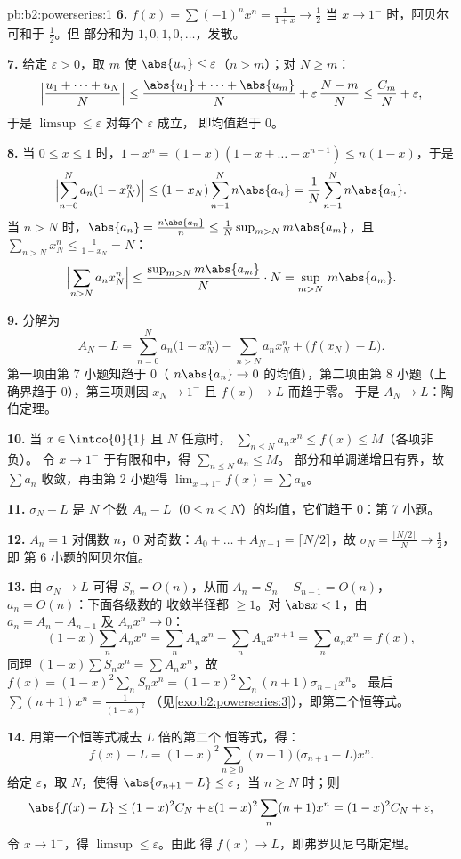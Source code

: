 \begin{solution}{pb:b2:powerseries:1}
\textbf{6.} $f(x) = \sum(-1)^nx^n = \frac{1}{1+x} \to \frac12$
当 $x \to 1^-$ 时，阿贝尔可和于 $\frac12$。但
部分和为 $1, 0, 1, 0, \dots$，发散。

\textbf{7.} 给定 $\varepsilon > 0$，取 $m$ 使 $\abs{u_n}
\leq \varepsilon$（$n > m$）；对 $N \geq m$：
\[
\Bigl|\frac{u_1 + \dots + u_N}{N}\Bigr|
\leq \frac{\abs{u_1} + \dots + \abs{u_m}}{N} +
\varepsilon\,\frac{N - m}{N}
\leq \frac{C_m}{N} + \varepsilon,
\]
于是 $\limsup \leq \varepsilon$ 对每个 $\varepsilon$ 成立，
即均值趋于 $0$。

\textbf{8.} 当 $0 \leq x \leq 1$ 时，$1 - x^n = (1-x)(1 + x +
\dots + x^{n-1}) \leq n(1-x)$，于是
\[
\Bigl|\sum_{n=0}^N a_n(1 - x_N^n)\Bigr|
\leq (1 - x_N)\sum_{n=1}^N n\abs{a_n}
= \frac1N\sum_{n=1}^{N}n\abs{a_n} .
\]
当 $n > N$ 时，$\abs{a_n} = \frac{n\abs{a_n}}{n} \leq
\frac{1}{N}\sup_{m>N}m\abs{a_m}$，且 $\sum_{n>N}x_N^n \leq
\frac{1}{1 - x_N} = N$：
\[
\Bigl|\sum_{n>N}a_nx_N^n\Bigr|
\leq \frac{\sup_{m>N}m\abs{a_m}}{N}\cdot N
= \sup_{m>N}\,m\abs{a_m} .
\]

\textbf{9.} 分解为
\[
A_N - L = \sum_{n=0}^{N}a_n\bigl(1 - x_N^n\bigr)
- \sum_{n>N}a_nx_N^n + \bigl(f(x_N) - L\bigr) .
\]
第一项由第 7 小题知趋于 $0$（
$n\abs{a_n} \to 0$ 的均值），第二项由第 8 小题（上确界趋于
$0$），第三项则因 $x_N \to 1^-$ 且 $f(x) \to L$ 而趋于零。
于是 $A_N \to L$：陶伯定理。

\textbf{10.} 当 $x \in \intco{0}{1}$ 且 $N$ 任意时，
$\sum_{n\leq N}a_nx^n \leq f(x) \leq M$（各项非负）。
令 $x \to 1^-$ 于有限和中，得 $\sum_{n\leq N}a_n \leq M$。
部分和单调递增且有界，故 $\sum a_n$
收敛，再由第 2 小题得 $\lim_{x\to1^-}f(x) =
\sum a_n$。

\textbf{11.} $\sigma_N - L$ 是 $N$ 个数
$A_n - L$（$0 \leq n < N$）的均值，它们趋于 $0$：第 7 小题。

\textbf{12.} $A_n = 1$ 对偶数 $n$，$0$ 对奇数：$A_0 + \dots
+ A_{N-1} = \lceil N/2\rceil$，故 $\sigma_N =
\frac{\lceil N/2\rceil}{N} \to \frac12$，即
第 6 小题的阿贝尔值。

\textbf{13.} 由 $\sigma_N \to L$ 可得 $S_n = O(n)$，从而
$A_n = S_n - S_{n-1} = O(n)$，$a_n = O(n)$：下面各级数的
收敛半径都 $\geq 1$。对 $\abs x < 1$，由 $a_n = A_n -
A_{n-1}$ 及 $A_nx^n \to 0$：
\[
(1-x)\sum_n A_nx^n = \sum_n A_nx^n - \sum_n A_nx^{n+1}
= \sum_n a_nx^n = f(x),
\]
同理 $(1-x)\sum S_nx^n = \sum A_nx^n$，故 $f(x) =
(1-x)^2\sum_n S_nx^n = (1-x)^2\sum_n(n+1)\sigma_{n+1}x^n$。
最后 $\sum(n+1)x^n = \frac{1}{(1-x)^2}$
（见\cref{exo:b2:powerseries:3}），即第二个恒等式。

\textbf{14.} 用第一个恒等式减去 $L$ 倍的第二个
恒等式，得：
\[
f(x) - L = (1-x)^2\sum_{n\geq0}(n+1)
\bigl(\sigma_{n+1} - L\bigr)x^n .
\]
给定 $\varepsilon$，取 $N$，使得 $\abs{\sigma_{n+1} - L}
\leq \varepsilon$，当 $n \geq N$ 时；则
\[
\abs{f(x) - L} \leq (1-x)^2 C_N +
\varepsilon(1-x)^2\sum_{n}(n+1)x^n
= (1-x)^2C_N + \varepsilon ,
\]
令 $x \to 1^-$，得 $\limsup \leq \varepsilon$。由此
得 $f(x) \to L$，即弗罗贝尼乌斯定理。


\end{solution}
